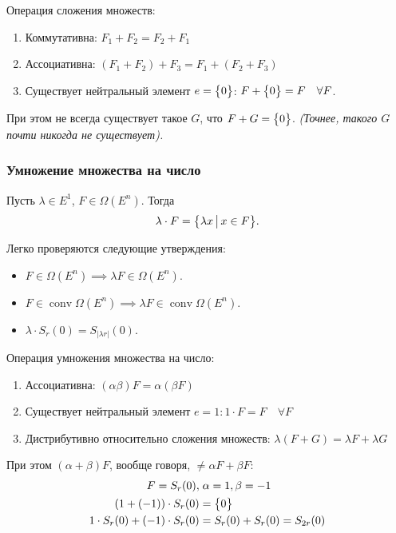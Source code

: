 \vspace{5mm}
Операция сложения множеств:
\begin{enumerate}
    \item Коммутативна: $F_1 + F_2 = F_2 + F_1$
    \item Ассоциативна: $(F_1 + F_2) + F_3 = F_1 + (F_2 + F_3)$
    \item Существует нейтральный элемент $e = \bigl\{ 0 \bigr\}$: $F + \bigl\{ 0 \bigr\} = F \quad \forall F$.
\end{enumerate}
При этом не всегда существует такое $G$, что $F + G = \bigl\{ 0 \bigr\}$.
\textit{(Точнее, такого $G$ почти никогда не существует).}

\subsubsection{Умножение множества на число}
\begin{defn}
    Пусть $\lambda \in E^1$, $F \in \Omega(E^n)$.
    Тогда
    \begin{equation}
        \lambda \cdot F = \bigl\{ \lambda x\, \bigl| \, x \in F \bigr\}.
    \end{equation}
\end{defn}

Легко проверяются следующие утверждения:
\begin{itemize}
    \item $F \in \Omega(E^n) \implies \lambda F \in \Omega(E^n)$.
    \item $F \in \operatorname{conv} \Omega(E^n) \implies \lambda F \in \operatorname{conv} \Omega(E^n)$.
    \item $\lambda \cdot S_r(0) = S_{|\lambda r|}(0)$.
\end{itemize}

Операция умножения множества на число:
\begin{enumerate}
    \item Ассоциативна: $(\alpha \beta) F = \alpha (\beta F)$
    \item Существует нейтральный элемент $e = 1\colon 1 \cdot F = F \quad \forall F$
    \item Дистрибутивно относительно сложения множеств: $\lambda (F + G) = \lambda F + \lambda G$
\end{enumerate}

При этом $(\alpha + \beta)F$, вообще говоря, $ \neq \alpha F + \beta F$:
\begin{align*}
    F = S_r(0), & \; \alpha = 1, \beta = -1 \\
    (1 + (-1)) \cdot S_r(0) & = \bigl\{ 0 \bigr\} \\
    1 \cdot S_r(0) + (-1) \cdot S_r(0) & = 
    S_r(0) + S_r(0) = S_{2 r}(0)
\end{align*}

